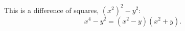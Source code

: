 This is a difference of squares, $\left(x^2\right)^2-y^2$:
\[x^4-y^2=\boxed{\left(x^2-y\right)\left(x^2+y\right)}.\]
